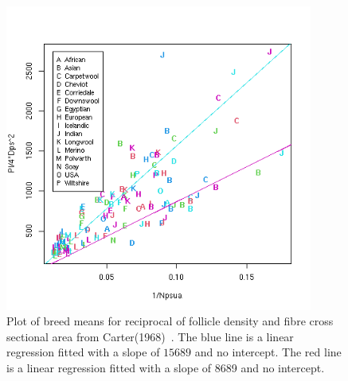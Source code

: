 %

\begin{figure}[h]
  \centering
   \includegraphics[width=0.9\textwidth]{cartercsax1ovn2reg.png}
  \caption{Plot of breed means for reciprocal of follicle density and fibre cross sectional area from Carter(1968)~\cite{cart:68}. The blue line is a linear regression fitted with a slope of $15689$ and no intercept. The red line is a linear regression fitted with a slope of 8689 and no intercept.}
  \label{fig:carter1ovnxc2reg}
\end{figure}

%

